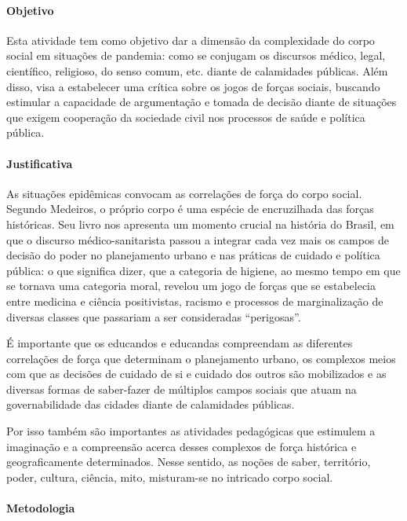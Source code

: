 \documentclass[12pt]{extarticle}
\begin{document}
\paragraph{Objetivo}

Esta atividade tem como objetivo dar a dimensão da complexidade do corpo
social em situações de pandemia: como se conjugam os discursos médico,
legal, científico, religioso, do senso comum, etc. diante de calamidades
públicas. Além disso, visa a estabelecer uma crítica sobre os jogos de
forças sociais, buscando estimular a capacidade de argumentação e tomada
de decisão diante de situações que exigem cooperação da sociedade civil
nos processos de saúde e política pública.

\paragraph{Justificativa}

As situações epidêmicas convocam as correlações de força do corpo
social. Segundo Medeiros, o próprio corpo é uma espécie de encruzilhada
das forças históricas. Seu livro nos apresenta um momento crucial na
história do Brasil, em que o discurso médico-sanitarista passou a
integrar cada vez mais os campos de decisão do poder no planejamento
urbano e nas práticas de cuidado e política pública: o que significa
dizer, que a categoria de higiene, ao mesmo tempo em que se tornava uma
categoria moral, revelou um jogo de forças que se estabelecia entre
medicina e ciência positivistas, racismo e processos de marginalização
de diversas classes que passariam a ser consideradas ``perigosas''.

É importante que os educandos e educandas compreendam as diferentes
correlações de força que determinam o planejamento urbano, os complexos
meios com que as decisões de cuidado de si e cuidado dos outros são
mobilizados e as diversas formas de saber-fazer de múltiplos campos
sociais que atuam na governabilidade das cidades diante de calamidades
públicas.

Por isso também são importantes as atividades pedagógicas que estimulem
a imaginação e a compreensão acerca desses complexos de força histórica
e geograficamente determinados. Nesse sentido, as noções de saber,
território, poder, cultura, ciência, mito, misturam-se no intricado
corpo social.

\paragraph{Metodologia}
\end{document}
